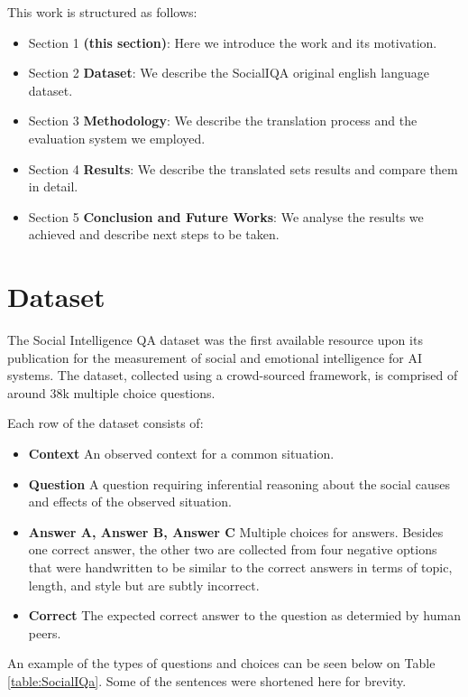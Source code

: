 \documentclass{article}
\begin{document}
This work is structured as follows:
\begin{itemize}
    \item Section 1 \textbf{(this section)}: Here we introduce the work and its
    motivation.
    \item Section 2 \textbf{Dataset}: We describe the SocialIQA original english
    language dataset.
    \item Section 3 \textbf{Methodology}: We describe the translation process
    and the evaluation system we employed.
    \item Section 4 \textbf{Results}: We describe the translated sets results
    and compare them in detail.
    \item Section 5 \textbf{Conclusion and Future Works}: We analyse the results
    we achieved and describe next steps to be taken.
\end{itemize}

\section{Dataset}
The Social Intelligence QA dataset was the first available resource upon its
publication for the measurement of social and emotional intelligence for AI
systems. The dataset, collected using a crowd-sourced framework,  is comprised
of around 38k multiple choice questions.

Each row of the dataset consists of:

\begin{itemize}
    \item \textbf{Context} An observed context for a common situation.
    \item \textbf{Question} A question requiring inferential reasoning
    about the social causes and effects of the observed situation.
    \item \textbf{Answer A, Answer B, Answer C} Multiple choices for answers.
    Besides one correct answer, the other two are collected from four negative
    options that were handwritten to be similar to the correct answers in terms of topic, length,
    and style but are subtly incorrect.
    \item \textbf{Correct} The expected correct answer to the question as
    determied by human peers.
\end{itemize}

An example of the types of questions and choices can be seen below on Table
\ref{table:SocialIQa}. Some of the sentences were shortened here for brevity.
\end{document}
